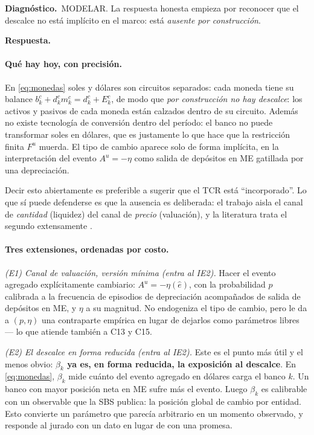 \documentclass[11pt]{article}
\newcommand{\diag}[1]{\par\noindent\textbf{Diagn\'ostico.}\ #1\par}
\newcommand{\resp}{\par\noindent\textbf{Respuesta.}\par}
\theoremstyle{definition}
\begin{document}
\diag{MODELAR. La respuesta honesta empieza por reconocer que el descalce no
est\'a impl\'icito en el marco: est\'a \emph{ausente por construcci\'on}.}

\resp

\paragraph{Qu\'e hay hoy, con precisi\'on.} En \eqref{eq:monedas} soles y d\'olares
son circuitos separados: cada moneda tiene su balance
$b^c_k+d^c_k m^c_k=d^c_k+E^c_k$, de modo que \emph{por construcci\'on no hay
descalce}: los activos y pasivos de cada moneda est\'an calzados dentro de su
circuito. Adem\'as no existe tecnolog\'ia de conversi\'on dentro del per\'iodo: el
banco no puede transformar soles en d\'olares, que es justamente lo que hace que
la restricci\'on finita $F^u$ muerda. El tipo de cambio aparece solo de forma
impl\'icita, en la interpretaci\'on del evento $A^u=-\eta$ como salida de
dep\'ositos en ME gatillada por una depreciaci\'on.

Decir esto abiertamente es preferible a sugerir que el TCR est\'a ``incorporado''.
Lo que s\'i puede defenderse es que la ausencia es deliberada: el trabajo aisla el
canal de \emph{cantidad} (liquidez) del canal de \emph{precio} (valuaci\'on), y la
literatura trata el segundo extensamente \citep{cespedes2004,bocolalorenzoni2020}.

\paragraph{Tres extensiones, ordenadas por costo.}

\emph{(E1) Canal de valuaci\'on, versi\'on m\'inima (entra al IE2).} Hacer el evento
agregado expl\'icitamente cambiario: $A^u=-\eta(\hat e)$, con la probabilidad $p$
calibrada a la frecuencia de episodios de depreciaci\'on acompa\~nados de salida de
dep\'ositos en ME, y $\eta$ a su magnitud. No endogeniza el tipo de cambio, pero
le da a $(p,\eta)$ una contraparte emp\'irica en lugar de dejarlos como
par\'ametros libres --- lo que atiende tambi\'en a C13 y C15.

\emph{(E2) El descalce en forma reducida (entra al IE2).} Este es el punto m\'as
\'util y el menos obvio: \textbf{$\beta_k$ ya es, en forma reducida, la exposici\'on
al descalce}. En \eqref{eq:monedas}, $\beta_k$ mide cu\'anto del evento agregado
en d\'olares carga el banco $k$. Un banco con mayor posici\'on neta en ME sufre m\'as
el evento. Luego $\beta_k$ es calibrable con un observable que la SBS publica:
la posici\'on global de cambio por entidad. Esto convierte un par\'ametro que
parec\'ia arbitrario en un momento observado, y responde al jurado con un dato en
lugar de con una promesa.
\end{document}
